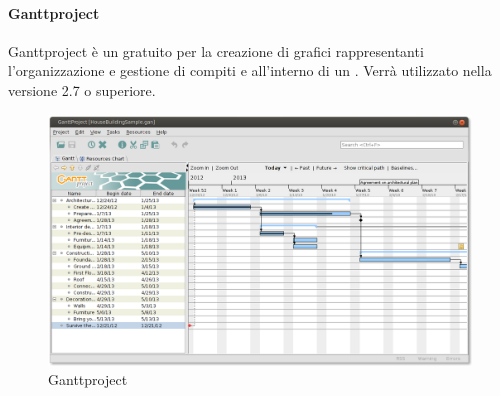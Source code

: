  \paragraph{Ganttproject} 
 Ganttproject è un  gratuito per la creazione di grafici rappresentanti l'organizzazione e gestione di compiti e  all'interno di un . Verrà utilizzato nella versione 2.7 o superiore.
\begin{figure}[h]
\centering
\includegraphics[scale=0.35]{img/gantt.png}
\caption{Ganttproject}\label{sec:Figura6}
\end{figure} 
 